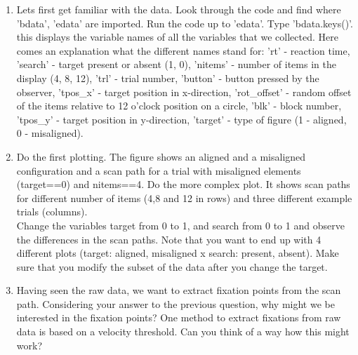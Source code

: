 \documentclass[12pt,english]{scrartcl}
\begin{document}
\begin{enumerate}
\item Lets first get familiar with the data. Look through the code and find where 'bdata', 'edata' are imported. Run the code up to 'edata'. Type 'bdata.keys()'. this displays the variable names of all the variables that we collected. Here comes an explanation what the different names stand for:
'rt' - reaction time, 'search' - target present or absent (1, 0), 'nitems' - number of items in the display (4, 8, 12), 'trl' - trial number, 'button' - button pressed by the observer, 'tpos\_x' - target position in x-direction, 'rot\_offset' - random offset of the items relative to 12 o'clock position on a circle, 'blk' - block number, 'tpos\_y' - target position in y-direction, 'target' - type of figure (1 - aligned, 0 - misaligned).

\item Do the first plotting. The figure shows an aligned and a misaligned configuration and a scan path for a trial with misaligned elements (target==0) and nitems==4. Do the more complex plot. It shows scan paths for different number of items (4,8 and 12 in rows) and three different example trials (columns).\\ 

Change the variables target from 0 to 1, and search from 0 to 1 and observe the differences in the scan paths. Note that you want to end up with 4 different plots (target: aligned, misaligned x search: present, absent). Make sure that you modify the subset of the data after you change the target.\\

 
 \color{black}
 \item Having seen the raw data, we want to extract fixation points from the scan path. Considering your answer to the previous question, why might we be interested in the fixation points? One method to extract fixations from raw data  is based on a velocity threshold. Can you think of a way how this might work? \\
 
%  
%  


\end{enumerate}
\end{document}
